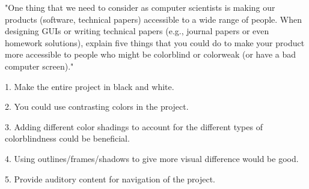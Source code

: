 \documentclass{article}
\begin{document}
\clearpage
\header

"One thing that we need to consider as computer scientists is making our products (software, technical papers) accessible to a wide range of people. When designing GUIs or writing technical papers (e.g., journal papers or even homework solutions), explain five things that you could do to make your product more accessible to people who might be colorblind or colorweak (or have a bad computer screen)."

1. Make the entire project in black and white.
\item 2. You could use contrasting colors in the project.
\item 3. Adding different color shadings to account for the different types of colorblindness could be beneficial.
\item 4. Using outlines/frames/shadows to give more visual difference would be good.
\item 5. Provide auditory content for navigation of the project.
\end{document}
